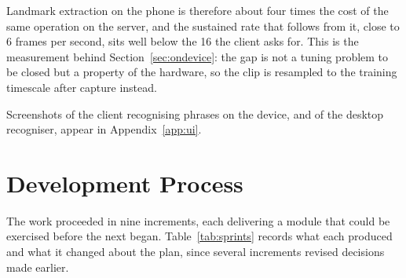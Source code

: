 Landmark extraction on the phone is therefore about four times the cost of the same operation on the server, and the sustained rate that follows from it, close to 6 frames per second, sits well below the 16 the client asks for. This is the measurement behind Section~\ref{sec:ondevice}: the gap is not a tuning problem to be closed but a property of the hardware, so the clip is resampled to the training timescale after capture instead.

\noindent Screenshots of the client recognising phrases on the device, and of the desktop recogniser, appear in Appendix~\ref{app:ui}.

\section{Development Process}

The work proceeded in nine increments, each delivering a module that could be exercised before the next began. Table~\ref{tab:sprints} records what each produced and what it changed about the plan, since several increments revised decisions made earlier.

